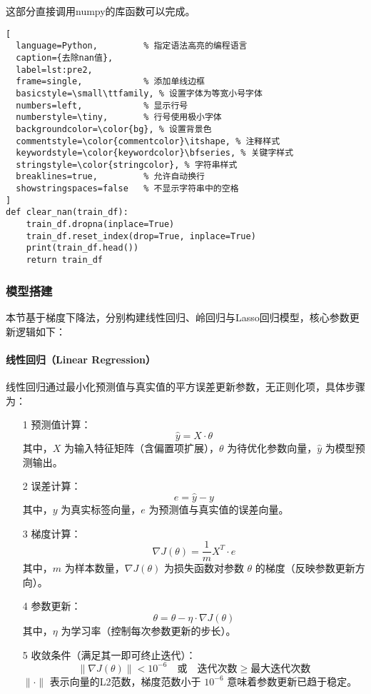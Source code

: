 这部分直接调用numpy的库函数可以完成。
\begin{lstlisting}[
  language=Python,         % 指定语法高亮的编程语言
  caption={去除nan值},
  label=lst:pre2,
  frame=single,            % 添加单线边框
  basicstyle=\small\ttfamily, % 设置字体为等宽小号字体
  numbers=left,            % 显示行号
  numberstyle=\tiny,       % 行号使用极小字体
  backgroundcolor=\color{bg}, % 设置背景色
  commentstyle=\color{commentcolor}\itshape, % 注释样式
  keywordstyle=\color{keywordcolor}\bfseries, % 关键字样式
  stringstyle=\color{stringcolor}, % 字符串样式
  breaklines=true,         % 允许自动换行
  showstringspaces=false   % 不显示字符串中的空格
]
def clear_nan(train_df):
    train_df.dropna(inplace=True)
    train_df.reset_index(drop=True, inplace=True)
    print(train_df.head())
    return train_df
\end{lstlisting}


\subsubsection{模型搭建}
\par 本节基于梯度下降法，分别构建线性回归、岭回归与Lasso回归模型，核心参数更新逻辑如下：

\paragraph{线性回归（Linear Regression）}
线性回归通过最小化预测值与真实值的平方误差更新参数，无正则化项，具体步骤为：
\begin{itemize}
\item [1] 预测值计算：
\[
\hat{y} = X \cdot \theta
\]
其中，$X$ 为输入特征矩阵（含偏置项扩展），$\theta$ 为待优化参数向量，$\hat{y}$ 为模型预测输出。

\item [2] 误差计算：
\[
e = \hat{y} - y
\]
其中，$y$ 为真实标签向量，$e$ 为预测值与真实值的误差向量。

\item [3] 梯度计算：
\[
\nabla J(\theta) = \frac{1}{m} X^T \cdot e
\]
其中，$m$ 为样本数量，$\nabla J(\theta)$ 为损失函数对参数 $\theta$ 的梯度（反映参数更新方向）。

\item [4] 参数更新：
\[
\theta = \theta - \eta \cdot \nabla J(\theta)
\]
其中，$\eta$ 为学习率（控制每次参数更新的步长）。

\item [5] 收敛条件（满足其一即可终止迭代）：
\[
\|\nabla J(\theta)\| < 10^{-6} \quad \text{或} \quad \text{迭代次数} \geq \text{最大迭代次数}
\]
$\|\cdot\|$ 表示向量的L2范数，梯度范数小于 $10^{-6}$ 意味着参数更新已趋于稳定。
\end{itemize}

